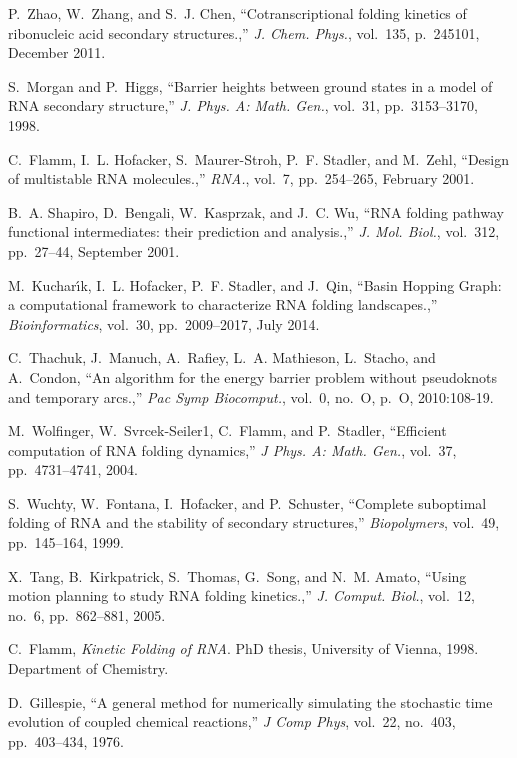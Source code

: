 \documentclass[11pt, oneside]{Thesis} %
\begin{document}
\begin{thebibliography}{100}
P.~Zhao, W.~Zhang, and S.~J. Chen, ``Cotranscriptional folding kinetics of
  ribonucleic acid secondary structures.,'' {\em J. Chem. Phys.}, vol.~135,
  p.~245101, December 2011.

S.~Morgan and P.~Higgs, ``Barrier heights between ground states in a model of
  {RNA} secondary structure,'' {\em J. Phys. A: Math. Gen.}, vol.~31,
  pp.~3153--3170, 1998.

C.~Flamm, I.~L. Hofacker, S.~Maurer-Stroh, P.~F. Stadler, and M.~Zehl, ``Design
  of multistable {RNA} molecules.,'' {\em RNA.}, vol.~7, pp.~254--265, February
  2001.

B.~A. Shapiro, D.~Bengali, W.~Kasprzak, and J.~C. Wu, ``{RNA} folding pathway
  functional intermediates: their prediction and analysis.,'' {\em J. Mol.
  Biol.}, vol.~312, pp.~27--44, September 2001.

M.~Kuchar{\'\i}k, I.~L. Hofacker, P.~F. Stadler, and J.~Qin, ``{Basin Hopping
  Graph: a computational framework to characterize RNA folding landscapes.},''
  {\em Bioinformatics}, vol.~30, pp.~2009--2017, July 2014.

C.~Thachuk, J.~Manuch, A.~Rafiey, L.~A. Mathieson, L.~Stacho, and A.~Condon,
  ``An algorithm for the energy barrier problem without pseudoknots and
  temporary arcs.,'' {\em Pac Symp Biocomput.}, vol.~0, no.~O, p.~O,
  2010:108-19.

M.~Wolfinger, W.~Svrcek-Seiler1, C.~Flamm, and P.~Stadler, ``Efficient
  computation of {RNA} folding dynamics,'' {\em J Phys. A: {Math.} {G}en.},
  vol.~37, pp.~4731--4741, 2004.

S.~Wuchty, W.~Fontana, I.~Hofacker, and P.~Schuster, ``Complete suboptimal
  folding of {RNA} and the stability of secondary structures,'' {\em
  Biopolymers}, vol.~49, pp.~145--164, 1999.

X.~Tang, B.~Kirkpatrick, S.~Thomas, G.~Song, and N.~M. Amato, ``Using motion
  planning to study {RNA} folding kinetics.,'' {\em J. Comput. Biol.}, vol.~12,
  no.~6, pp.~862--881, 2005.

C.~Flamm, {\em Kinetic Folding of {RNA}}.
\newblock PhD thesis, University of Vienna, 1998.
\newblock Department of Chemistry.

D.~Gillespie, ``A general method for numerically simulating the stochastic time
  evolution of coupled chemical reactions,'' {\em J Comp Phys}, vol.~22,
  no.~403, pp.~403--434, 1976.


\end{thebibliography}
\end{document}
